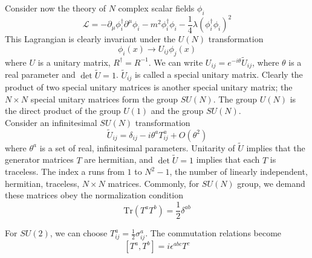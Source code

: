 \noindent
Consider now the theory of $N$ complex scalar fields $\phi_i$
\[\mathcal{L} = -\partial_{\mu}\phi^{\dagger}_i \partial^{\mu}\phi_i - m^2\phi_i^{\dagger}\phi_i - \frac{1}{4}\lambda(\phi_i^{\dagger}\phi_i)^2\]
This Lagrangian is clearly invariant under the $U(N)$ transformation
\[\phi_i(x) \to U_{ij}\phi_j(x)\]
where $U$ is a unitary matrix, $R^{\dagger} = R^{-1}$. We can write $U_{ij} = e^{-i\theta} \widetilde{U}_{ij}$, where $\theta$ is a real parameter and $\det \widetilde{U} = 1$.
$\widetilde{U}_{ij}$ is called a special unitary matrix.
Clearly the product of two special unitary matrices is another special unitary matrix; the $N \times N$ special unitary matrices form the group $SU(N)$. 
The group $U(N)$ is the direct product of the group $U(1)$ and the group $SU(N)$.\\
Consider an infinitesimal $SU(N)$ transformation
\[\widetilde{U}_{ij} = \delta_{ij} - i\theta^aT^a_{ij} + O(\theta^2)\]
where $\theta^a$ is a set of real, infinitesimal parameters. Unitarity of $\widetilde{U}$ implies that the generator matrices $T$ are hermitian, and $\det \widetilde{U} = 1$ implies that each $T$ is traceless.
The index a runs from $1$ to $N^2 - 1$, the number of linearly independent, hermitian, traceless, $N \times N$ matrices. Commonly, for $SU(N)$ group, we demand these matrices obey the normalization condition
\[\mathrm{Tr}(T^a T^b) =\frac{1}{2}\delta^{ab}\]

\begin{example}
For $SU(2)$, we can choose $T^a_{ij} = \frac{1}{2}\sigma^a_{ij}$. The commutation relations become
\[[T^a,T^b] = i\epsilon^{abc}T^c\]
\end{example}

